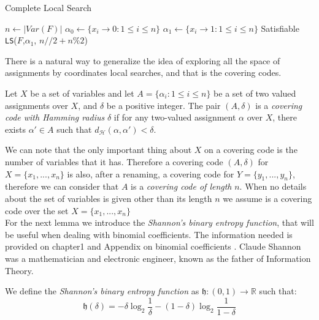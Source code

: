 \begin{algorithm}
  \caption{Complete Local Search}\label{cls}
  \begin{algorithmic}[1]
    \State $n \gets |Var(F)|$
    \State $\alpha_0 \gets \{x_i \to 0 : 1 \le i \le n\}$
    \State $\alpha_1 \gets \{x_i \to 1 : 1 \le i \le n\}$
    \State
     \Return Satisfiable 
    \EndIf
    \State \Return \texttt{LS}($F$,$\alpha_1$, $n//2 + n\%2$)
	\EndProcedure
\end{algorithmic}
\end{algorithm}



There is a natural way to generalize the idea of exploring all the space of assignments by coordinates local searches, and that is the covering codes.

\begin{definition}
  Let $X$ be a set of variables and let $A = \{\alpha_i: 1 \le i \le n\}$ be a set of two valued assignments over $X$, and $\delta$ be a positive integer. The pair $(A,\delta)$ is a \emph{covering code with Hamming radius} $\delta$ if for any  two-valued assignment  $\alpha$  over $X$, there exists $\alpha'\in A$ such that $d_\mathcal{H} (\alpha, \alpha') < \delta$.
\end{definition}


We can note that the only important thing about $X$ on a covering code is the number of variables that it has. Therefore a covering code $(A,\delta)$ for $X=\{x_1,...,x_n\}$ is also, after a renaming, a covering code for $Y=\{y_1,...,y_n\}$, therefore we can consider that $A$ is a \emph{covering code of length} $n$. When no details about the set of variables is given other than its length $n$ we assume is a covering code over the set $X = \{x_1,...,x_n\}$\\


For the next lemma we introduce the \emph{Shannon's binary entropy function}, that will be useful when dealing with binomial coefficients. The information needed is provided on chapter1 \cite{mackay2003information} and Appendix on binomial coefficients \cite{schoning2013satisfiability}. Claude Shannon was a mathematician and electronic engineer, known as the father of Information Theory. 

\begin{definition}
  We define the \emph{Shannon's binary entropy function} as $\mathfrak{h}:(0,1)\to \mathbb{R}$ such that:
  $$ \mathfrak{h}(\delta) = -  \delta \log_2 \frac{1}{\delta}  - (1-\delta)\log_2 \frac{1}{1-\delta}$$
\end{definition}

